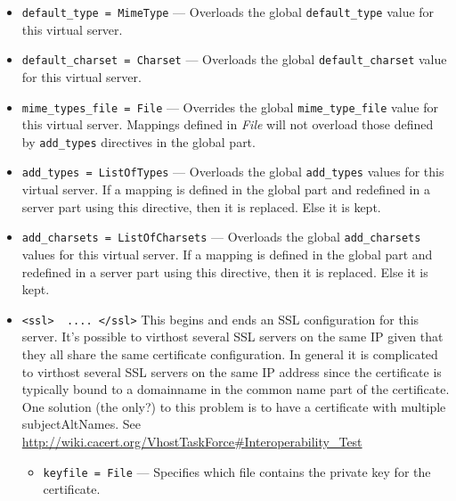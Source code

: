 \documentclass[11pt,oneside,english]{book}
\begin{document}
\begin{itemize}
\item        \verb+default_type = MimeType+ ---
              Overloads the global \verb+default_type+ value for this virtual
              server.

\item        \verb+default_charset = Charset+ ---
              Overloads the global \verb+default_charset+ value for this virtual
              server.

\item        \verb+mime_types_file = File+ ---
              Overrides the global \verb+mime_type_file+ value for this virtual
              server. Mappings defined in \textit{File} will not overload those
              defined by \verb+add_types+ directives in the global part.

\item        \verb+add_types = ListOfTypes+ ---
               Overloads the global \verb+add_types+ values for this virtual
               server. If a mapping is defined in the global part and redefined
               in a server part using this directive, then it is replaced. Else
               it is kept.

\item        \verb+add_charsets = ListOfCharsets+ ---
              Overloads the global \verb+add_charsets+ values for this virtual
              server. If a mapping is defined in the global part and redefined
              in a server part using this directive, then it is replaced. Else
              it is kept.

\item        \verb+<ssl>  .... </ssl>+
               This begins and ends an SSL configuration for this server. It's
               possible to virthost several SSL servers on the same IP given
               that they all share the same certificate configuration. In
               general it is complicated to virthost several SSL servers on the
               same IP address since the certificate is typically bound to a
               domainname in the common name part of the certificate. One
               solution (the only?)  to this problem is to have a certificate
               with multiple subjectAltNames. See
               \url{http://wiki.cacert.org/VhostTaskForce#Interoperability_Test}

               \begin{itemize}
               \item \verb+keyfile = File+ --- Specifies which file contains the
                 private key for the certificate.


\end{itemize}
\end{itemize}
\end{document}
